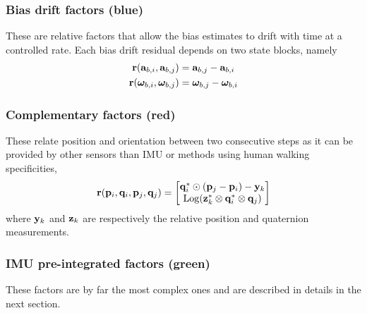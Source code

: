 \subsubsection{Bias drift factors (blue)}

These are relative factors that allow the bias estimates to drift with time at a controlled rate. Each bias drift residual depends on two state blocks, namely
%
\begin{align}
\begin{split}
{\bf r}({\bf a}_{b,i}, {\bf a}_{b,j}) &= {\bf a}_{b,j} - {\bf a}_{b,i} 
\\
{\bf r}({{\bm \omega}}_{b,i} , {{\bm \omega}}_{b,j})  &= {{\bm \omega}}_{b,j}  - {{\bm \omega}}_{b,i}
\end{split}
\end{align}

\subsubsection{Complementary factors (red)}

These relate position and orientation between two consecutive steps as it can be provided by other sensors than IMU or methods using human walking specificities,
%
\begin{align}
{\bf r}({\bf p}_i,{\bf q}_i,{\bf p}_j,{\bf q}_j) = \begin{bmatrix}
{\bf q}_i^*\odot({\bf p}_j-{\bf p}_i) - {\bf y}_k \\
\operatorname*{Log}({\bf z}_k^*\otimes{\bf q}_i^*\otimes{\bf q}_j)
\end{bmatrix}
\end{align}
%
where ${\bf y}_k$ and ${\bf z}_k$ are respectively the relative position and quaternion measurements.

\subsubsection{IMU pre-integrated factors (green)}

These factors are by far the most complex ones and are described in details in the next section.
